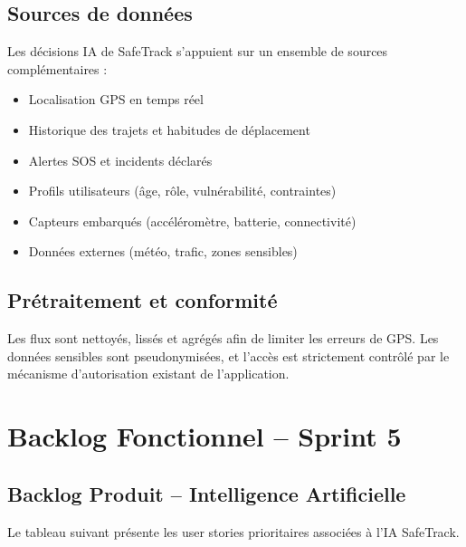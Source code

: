 \subsection{Sources de données}
Les décisions IA de SafeTrack s'appuient sur un ensemble de sources complémentaires :
\begin{itemize}
    \item Localisation GPS en temps réel
    \item Historique des trajets et habitudes de déplacement
    \item Alertes SOS et incidents déclarés
    \item Profils utilisateurs (âge, rôle, vulnérabilité, contraintes)
    \item Capteurs embarqués (accéléromètre, batterie, connectivité)
    \item Données externes (météo, trafic, zones sensibles)
\end{itemize}

\subsection{Prétraitement et conformité}
Les flux sont nettoyés, lissés et agrégés afin de limiter les erreurs de GPS. Les données sensibles sont pseudonymisées, et l'accès est strictement contrôlé par le mécanisme d'autorisation existant de l'application.

\section{Backlog Fonctionnel – Sprint 5}

\subsection{Backlog Produit – Intelligence Artificielle}
Le tableau suivant présente les user stories prioritaires associées à l'IA SafeTrack.

